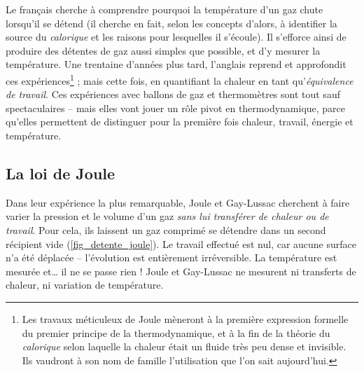 		Le français  cherche à comprendre pourquoi la température d’un gaz chute lorsqu’il se détend (il cherche en fait, selon les concepts d’alors, à identifier la source du \textit{calorique} et les raisons pour lesquelles il s’écoule). Il s’efforce ainsi de produire des détentes de gaz aussi simples que possible, et d’y mesurer la température. Une trentaine d’années plus tard, l’anglais  reprend et approfondit ces expériences\footnote{Les travaux méticuleux de Joule mèneront à la première expression formelle du premier principe de la thermodynamique, et à la fin de la théorie du \textit{calorique} selon laquelle la chaleur était un fluide très peu dense et invisible. Ils vaudront à son nom de famille l’utilisation que l’on sait aujourd’hui.} ; mais cette fois, en quantifiant la chaleur en tant qu’\textit{équivalence de travail}. Ces expériences avec ballons de gaz et thermomètres sont tout sauf spectaculaires -- mais elles vont jouer un rôle pivot en thermodynamique, parce qu’elles permettent de distinguer pour la première fois chaleur, travail, énergie et température.

	\subsection{La loi de Joule}
	\label{ch_principe_de_joule}

		Dans leur expérience la plus remarquable, Joule et Gay-Lussac cherchent à faire varier la pression et le volume d’un gaz \textit{sans lui transférer de chaleur ou de travail}. Pour cela, ils laissent un gaz comprimé se détendre dans un second récipient vide (\cref{fig_detente_joule}). Le travail effectué est nul, car aucune surface n’a été déplacée – l’évolution est entièrement irréversible. La température est mesurée et… il ne se passe rien ! Joule et Gay-Lussac ne mesurent ni transferts de chaleur, ni variation de température.

